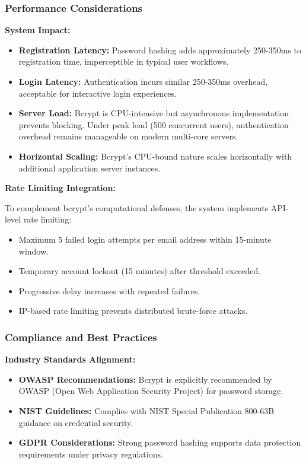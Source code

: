 \documentclass[12pt,a4paper]{article}
\begin{document}
\begin{tcolorbox}[colback=primaryblue!5, colframe=primaryblue, boxrule=1pt, arc=3pt, left=10pt, right=10pt, top=8pt, bottom=8pt]
\subsubsection{Performance Considerations}

\textbf{System Impact:}

\begin{itemize}[leftmargin=2em, itemsep=6pt]
    \item \textbf{Registration Latency:} Password hashing adds approximately 250-350ms to registration time, imperceptible in typical user workflows.
    \item \textbf{Login Latency:} Authentication incurs similar 250-350ms overhead, acceptable for interactive login experiences.
    \item \textbf{Server Load:} Bcrypt is CPU-intensive but asynchronous implementation prevents blocking. Under peak load (500 concurrent users), authentication overhead remains manageable on modern multi-core servers.
    \item \textbf{Horizontal Scaling:} Bcrypt's CPU-bound nature scales horizontally with additional application server instances.
\end{itemize}

\vspace{0.5em}

\textbf{Rate Limiting Integration:}

To complement bcrypt's computational defenses, the system implements API-level rate limiting:

\begin{itemize}[leftmargin=2em, itemsep=6pt]
    \item Maximum 5 failed login attempts per email address within 15-minute window.
    \item Temporary account lockout (15 minutes) after threshold exceeded.
    \item Progressive delay increases with repeated failures.
    \item IP-based rate limiting prevents distributed brute-force attacks.
\end{itemize}

\subsubsection{Compliance and Best Practices}

\textbf{Industry Standards Alignment:}

\begin{itemize}[leftmargin=2em, itemsep=6pt]
    \item \textbf{OWASP Recommendations:} Bcrypt is explicitly recommended by OWASP (Open Web Application Security Project) for password storage.
    \item \textbf{NIST Guidelines:} Complies with NIST Special Publication 800-63B guidance on credential security.
    \item \textbf{GDPR Considerations:} Strong password hashing supports data protection requirements under privacy regulations.
\end{itemize}


\end{tcolorbox}
\end{document}
